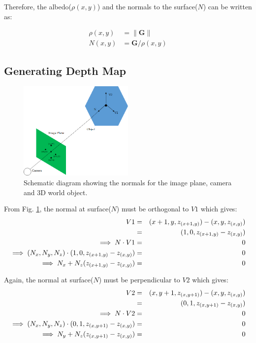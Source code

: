 \documentclass[11pt]{article}
\newcommand{\GB}{\mathbf{G}}
\begin{document}
Therefore, the albedo($\rho(x,y)$) and the normals to the surface($N$) can be written as:

\begin{align}
\rho(x,y) &= \| \GB\| \label{eq8} \\
N(x,y)  &= \GB / {\rho(x,y)} \label{eq9} 
\end{align}

\clearpage
\subsection{Generating Depth Map}
 
 \begin{figure}[!hbt]
 \centering
 \includegraphics[width = 0.5\textwidth]{pic5.png}
 \caption{Schematic diagram showing the normals for the image plane, camera and 3D world object. }
 \label{fig4}
 \end{figure}
 
 From Fig. \ref{fig4}, the normal at surface($N$) must be orthogonal to $V1$ which gives:
 \vspace{-10pt} 
 \begin{eqnarray}
   V1 &=& (x+1,y,z_{(x+1,y)}) - (x,y,z_{(x,y)}) \notag \\ 
        &=& (1,0, z_{(x+1,y)} - z_{(x,y)}) \notag \\
\implies N \cdot V1 &=& 0 \notag \\
\implies (N_x, N_y, N_z) \cdot (1, 0, z_{(x+1,y)} - z_{(x,y)}) &=& 0 \notag \\
\implies N_x + N_z(z_{(x+1,y)} - z_{(x,y)}) &=& 0
\label{eq10}
 \end{eqnarray}

 Again, the normal at surface($N$) must be perpendicular to $V2$ which gives:
 \vspace{-10pt}
 \begin{eqnarray}
  V2 &=& (x,y+1,z_{(x,y+1)}) - (x,y,z_{(x,y)}) \notag \\ 
     &=& (0,1, z_{(x,y+1)} - z_{(x,y)}) \notag \\
\implies N \cdot V2 &=& 0 \notag \\
\implies (N_x, N_y, N_z) \cdot (0, 1, z_{(x,y+1)} - z_{(x,y)}) &=& 0 \notag \\
\implies N_y + N_z(z_{(x,y+1)} - z_{(x,y)}) &=& 0
\label{eq11} 
 \end{eqnarray}
 
\end{document}
